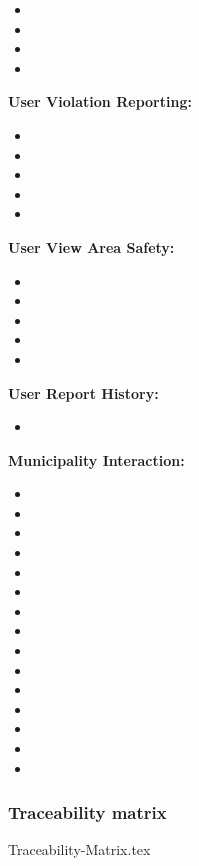 \begin{itemize}
	\item {}
	\item {}
	\item {}
	\item {}
\end{itemize}

	

\textbf{User Violation Reporting:}

\begin{itemize}
	\item {}
	\item {}
	\item {}
	\item {}
	\item {}
\end{itemize}


\textbf{User View Area Safety:}

\begin{itemize}
\item {}
	\item {}
	\item {}
	\item {}
	\item {}
	
\end{itemize}

\textbf{User Report History:}

\begin{itemize}
	\item {}
\end{itemize}



\textbf{Municipality Interaction:}

\begin{itemize}
\item {}
	\item {}
	\item {}
	\item {}
	\item {}
	\item {}
	\item {}
	\item {}
	\item {}
	\item {}
	\item {}
	\item {}
	\item {}
	\item {}
	\item {}
\end{itemize}

\subsubsection{Traceability matrix}
{Traceability-Matrix.tex}
